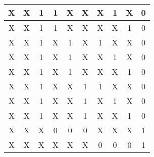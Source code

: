 \begin{center}
\begin{table}[h]
\begin{center}
\begin{tabular}{|c|c|c|c|c|c|c|c|c||c|}
            X  & X  & 1  & 1  & X  & X  & X  & 1  & X  & 0 \\ \hline
            X  & X  & 1  & 1  & X  & X  & X  & X  & 1  & 0 \\ \hline
            X  & X  & 1  & X  & 1  & X  & 1  & X  & X  & 0 \\ \hline
            X  & X  & 1  & X  & 1  & X  & X  & 1  & X  & 0 \\ \hline
            X  & X  & 1  & X  & 1  & X  & X  & X  & 1  & 0 \\ \hline
            X  & X  & 1  & X  & X  & 1  & 1  & X  & X  & 0 \\ \hline
            X  & X  & 1  & X  & X  & 1  & X  & 1  & X  & 0 \\ \hline
            X  & X  & 1  & X  & X  & 1  & X  & X  & 1  & 0 \\ \hline
            X  & X  & X  & 0  & 0  & 0  & X  & X  & X  & 1 \\ \hline
            X  & X  & X  & X  & X  & X  & 0  & 0  & 0  & 1 \\ \hline
            \end{tabular}
        \end{center}
    \end{table}
\end{center}
